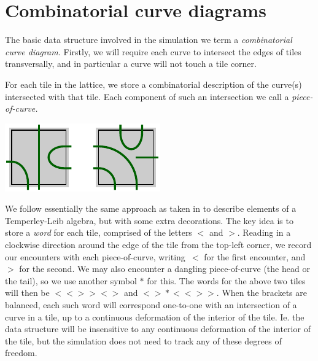 \documentclass[aps, prl, letterpaper, twocolumn, superscriptaddress, notitlepage, 10pt]{revtex4-1}
\begin{document}
%
%

%
%

%
%

\section{Combinatorial curve diagrams}

The basic data structure involved in the
simulation we term a \emph{combinatorial curve
diagram.}
Firstly, we will require each curve to intersect 
the edges of tiles transversally,
and in particular a curve will not touch a tile corner.

For each tile in the lattice,
we store a combinatorial
description of the curve(s) intersected with that tile.
Each component of such an intersection we call a \emph{piece-of-curve.}
\begin{center}
\includegraphics[]{pic-cells.pdf}
\end{center}

We follow essentially the same approach as taken in \cite{Abramsky2007} 
to describe elements of a Temperley-Leib algebra, but
with some extra decorations.
The key idea is to store a \emph{word} for each tile, comprised of
the letters $\bigl<$ and $\bigr>$.
Reading in a clockwise direction around the edge of
the tile from the top-left corner,
we record our encounters with each piece-of-curve,
writing~$\bigl<$ for the first encounter, and~$\bigr>$ for the
second.
We may also encounter a dangling piece-of-curve
(the head or the tail), so we use another symbol $*$ for this.
The words for the above two tiles will then be 
$\bigl<\bigl<\bigr>\bigr>\bigl<\bigr>$ and $\bigl<\bigr>*\bigl<\bigl<\bigr>\bigr>.$
When the brackets are balanced,
each such word will correspond one-to-one with an intersection
of a curve in a tile, up to a continuous deformation of the interior of the tile.
Ie. the data structure 
will be insensitive to any continuous deformation of the interior of the tile,
but the simulation does not need to track any of these degrees of freedom.
\end{document}
